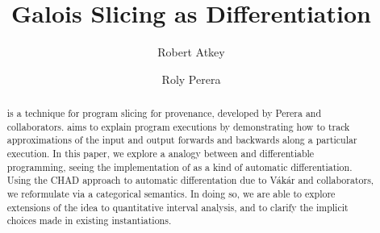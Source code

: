 \documentclass[acmsmall,screen,anonymous,review]{acmart}
\begin{document}
\title{Galois Slicing as Differentiation}

\author{Robert Atkey}

\author{Roly Perera}

\begin{abstract}
  \GPS is a technique for program slicing for provenance, developed by
  Perera and collaborators. \GPS aims to explain program executions by
  demonstrating how to track approximations of the input and output
  forwards and backwards along a particular execution. In this paper,
  we explore a analogy between \GPS and differentiable programming,
  seeing the implementation of \GPS as a kind of automatic
  differentiation. Using the CHAD approach to automatic differentation
  due to V{\'a}k{\'a}r and collaborators, we reformulate \GPS via a
  categorical semantics. In doing so, we are able to explore
  extensions of the \GPS idea to quantitative interval analysis, and
  to clarify the implicit choices made in existing \GPS
  instantiations.
\end{abstract}
\maketitle












% 
\end{document}
